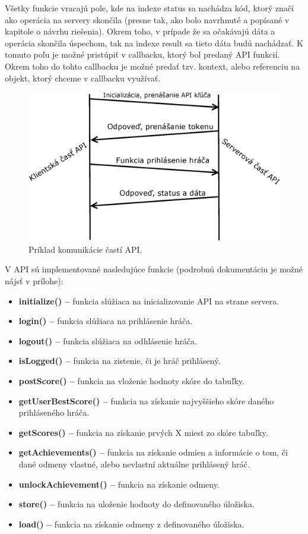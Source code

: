 Všetky funkcie vracajú pole, kde na indexe status sa nachádza kód, ktorý značí ako operácia na servery skončila (presne tak, ako bolo navrhnuté a popísané v kapitole o návrhu riešenia). Okrem toho, v prípade že sa očakávajú dáta a operácia skončila úspechom, tak na indexe result sa tieto dáta budú nachádzať. K tomuto poľu je možné pristúpiť v callbacku, ktorý bol predaný API funkcií. Okrem toho do tohto callbacku je možné predať tzv. kontext, alebo referenciu na objekt, ktorý chceme v callbacku využívať. 


\begin{figure}[h]
  \centering
  \includegraphics[scale=0.45]{fig/implementacia-komunikacia.eps}
  \caption{Príklad komunikácie častí API.}
  \label{fig:implementaciakomunikacia}
\end{figure}

V API sú implementované nasledujúce funkcie (podrobnú dokumentáciu je možné nájsť v prílohe):
\begin{itemize}
\item \textbf{initialize() –} funkcia slúžiaca na inicializovanie API na strane servera.
\item \textbf{login() –} funkcia slúžiaca na prihlásenie hráča.
\item \textbf{logout() –} funkcia slúžiaca na odhlásenie hráča.
\item \textbf{isLogged() –} funkcia na zistenie, či je hráč prihlásený.
\item \textbf{postScore() –} funkcia na vloženie hodnoty skóre do tabuľky.
\item \textbf{getUserBestScore() –} funkcia na získanie najvyššieho skóre daného prihláseného hráča.
\item \textbf{getScores() –} funkcia na získanie prvých X miest zo skóre tabuľky.
\item \textbf{getAchievements() –} funkcia na získanie odmien a informácie o tom, či dané odmeny vlastné, alebo nevlastní aktuálne prihlásený hráč.
\item \textbf{unlockAchievement() –} funkcia na získanie odmeny.
\item \textbf{store() –} funkcia na uloženie hodnoty do definovaného úložiska.
\item \textbf{load() –} funkcia na získanie odmeny z definovaného úložiska.
\end{itemize}

